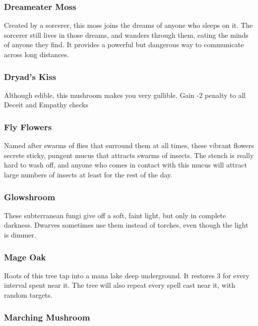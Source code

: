 \begin{multicols}{2}
\subsubsection{Dreameater Moss}
\label{dreameater_moss}

Created by a sorcerer, this moss joins the dreams of anyone who sleeps on it.
The sorcerer still lives in those dreams, and wanders through them, eating the minds of anyone they find.
It provides a powerful but dangerous way to communicate across long distances.

\subsubsection{Dryad's Kiss}
\label{dryads_kiss}

Although edible, this mushroom makes you very gullible. Gain -2 penalty to all Deceit and Empathy checks

\subsubsection{Fly Flowers}
\label{fly_flowers}

Named after swarms of flies that surround them at all times, these vibrant flowers secrete sticky, pungent mucus that attracts swarms 
of insects. The stench is really hard to wash off, and anyone who comes in contact with this mucus will attract large numbers of 
insects at least for the rest of the day.

\subsubsection{Glowshroom}
\label{glowshroom}

These subterranean fungi give off a soft, faint light, but only in complete darkness. Dwarves sometimes use them instead of torches, 
even though the light is dimmer.

\subsubsection{Mage Oak}
\label{mage_oak}

Roots of this tree tap into a mana lake deep underground.
It restores 3  for every \gls{interval} spent near it.
The tree will also repeat every spell cast near it, with random targets.

\subsubsection{Marching Mushroom}
\label{marching_mushroom}


\end{multicols}
